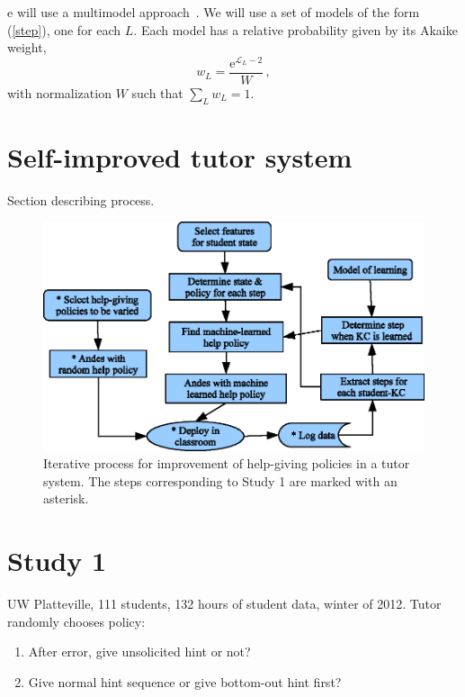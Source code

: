 \documentclass{edm_template}
\begin{document}
e will use a multimodel approach~\cite{burnham_model_2002}.
We will use a set of models of the form (\ref{step}), 
one for each $L$. Each model has a relative probability given 
by its Akaike weight,  
%
\begin{equation}
                   w_L = \frac{\mathrm{e}^{\mathcal{L}_L-2}}{W}\, ,
\end{equation}
%
with normalization $W$ such that $\sum_L w_L=1$.


\section{Self-improved tutor system}

Section describing process.
%
%
%
\begin{figure}
\centering    \includegraphics{process.eps}
\caption{Iterative process for improvement of help-giving policies in a
  tutor system.  The steps corresponding to Study 1 are marked
  with an asterisk.} \label{process}
\end{figure}

\section{Study 1}

UW Platteville, 111 students, 132 hours of student data, winter of 2012.  
Tutor randomly chooses policy: 
\begin{enumerate} 
\item After error, give unsolicited hint or not?
\item Give normal hint sequence or give bottom-out hint first?  
\end{enumerate}
\end{document}
